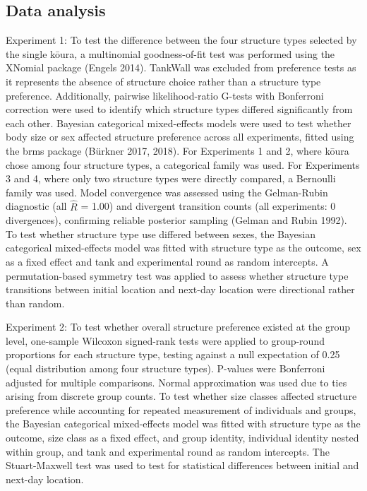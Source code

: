 \documentclass[
  12pt,
  a4paper,
  oneside]{scrbook}
\begin{document}
\subsection{Data analysis}\label{data-analysis-1}

Experiment 1: To test the difference between the four structure types
selected by the single kōura, a multinomial goodness-of-fit test was
performed using the XNomial package (Engels 2014). TankWall was excluded
from preference tests as it represents the absence of structure choice
rather than a structure type preference. Additionally, pairwise
likelihood-ratio G-tests with Bonferroni correction were used to
identify which structure types differed significantly from each other.
Bayesian categorical mixed-effects models were used to test whether body
size or sex affected structure preference across all experiments, fitted
using the brms package (Bürkner 2017, 2018). For Experiments 1 and 2,
where kōura chose among four structure types, a categorical family was
used. For Experiments 3 and 4, where only two structure types were
directly compared, a Bernoulli family was used. Model convergence was
assessed using the Gelman-Rubin diagnostic (all \(\hat{R}\) = 1.00) and
divergent transition counts (all experiments: 0 divergences), confirming
reliable posterior sampling (Gelman and Rubin 1992). To test whether
structure type use differed between sexes, the Bayesian categorical
mixed-effects model was fitted with structure type as the outcome, sex
as a fixed effect and tank and experimental round as random intercepts.
A permutation-based symmetry test was applied to assess whether
structure type transitions between initial location and next-day
location were directional rather than random.

Experiment 2: To test whether overall structure preference existed at
the group level, one-sample Wilcoxon signed-rank tests were applied to
group-round proportions for each structure type, testing against a null
expectation of 0.25 (equal distribution among four structure types).
P-values were Bonferroni adjusted for multiple comparisons. Normal
approximation was used due to ties arising from discrete group counts.
To test whether size classes affected structure preference while
accounting for repeated measurement of individuals and groups, the
Bayesian categorical mixed-effects model was fitted with structure type
as the outcome, size class as a fixed effect, and group identity,
individual identity nested within group, and tank and experimental round
as random intercepts. The Stuart-Maxwell test was used to test for
statistical differences between initial and next-day location.
\end{document}
